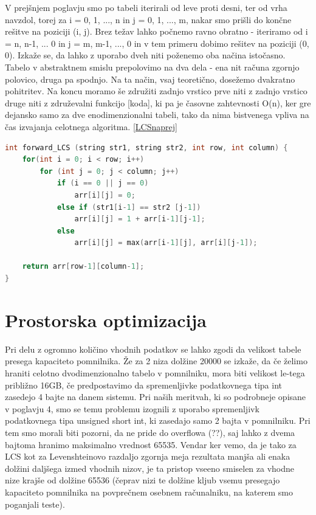 \documentclass[a4paper,12pt,openright]{book}
\begin{document}
V prejšnjem poglavju smo po tabeli iterirali od leve proti desni, ter od vrha navzdol, torej za i = 0, 1, ..., n in j = 0, 1, ..., m, nakar smo prišli do končne rešitve na poziciji (i, j). Brez težav lahko počnemo ravno obratno - iteriramo od i = n, n-1, ... 0 in j = m, m-1, ..., 0 in v tem primeru dobimo rešitev na poziciji (0, 0). Izkaže se, da lahko z uporabo dveh niti poženemo oba načina istočasno. Tabelo v abstraktnem smislu prepolovimo na dva dela - ena nit računa zgornjo polovico, druga pa spodnjo. Na ta način, vsaj teoretično, dosežemo dvakratno pohitritev. Na koncu moramo še združiti zadnjo vrstico prve niti z zadnjo vrstico druge niti z združevalni funkcijo [koda], ki pa je časovne zahtevnosti O(n), ker gre dejansko samo za dve enodimenzionalni tabeli, tako da nima bistvenega vpliva na čas izvajanja celotnega algoritma. \ref{LCSnaprej}

\begin{lstlisting}[language=C++, caption={Algoritem LCS naprej}, captionpos=b, label=LCSnaprej]
int forward_LCS (string str1, string str2, int row, int column) {
    for(int i = 0; i < row; i++) 
        for (int j = 0; j < column; j++) 
            if (i == 0 || j == 0)
                arr[i][j] = 0;
            else if (str1[i-1] == str2 [j-1])
                arr[i][j] = 1 + arr[i-1][j-1];
            else
                arr[i][j] = max(arr[i-1][j], arr[i][j-1]);

    return arr[row-1][column-1];
}
\end{lstlisting}






\section{Prostorska optimizacija}

Pri delu z ogromno količino vhodnih podatkov se lahko zgodi da velikost tabele presega kapaciteto pomnilnika. Že za 2 niza dolžine 20000 se izkaže, da če želimo hraniti celotno dvodimenzionalno tabelo v pomnilniku, mora biti velikost le-tega približno 16GB, če predpostavimo da spremenljivke podatkovnega tipa int zasedejo 4 bajte na danem sistemu. Pri naših meritvah, ki so podrobneje opisane v poglavju 4, smo se temu problemu izognili z uporabo spremenljivk podatkovnega tipa unsigned short int, ki zasedajo samo 2 bajta v pomnilniku. Pri tem smo morali biti pozorni, da ne pride do overflowa (??), saj lahko z dvema bajtoma hranimo maksimalno vrednost 65535. Vendar ker vemo, da je tako za LCS kot za Levenshteinovo razdaljo zgornja meja rezultata manjša ali enaka dolžini daljšega izmed vhodnih nizov, je ta pristop vseeno smiselen za vhodne nize krajše od dolžine 65536 (čeprav nizi te dolžine kljub vsemu presegajo kapaciteto pomnilnika na povprečnem osebnem računalniku, na katerem smo poganjali teste). 
\end{document}
